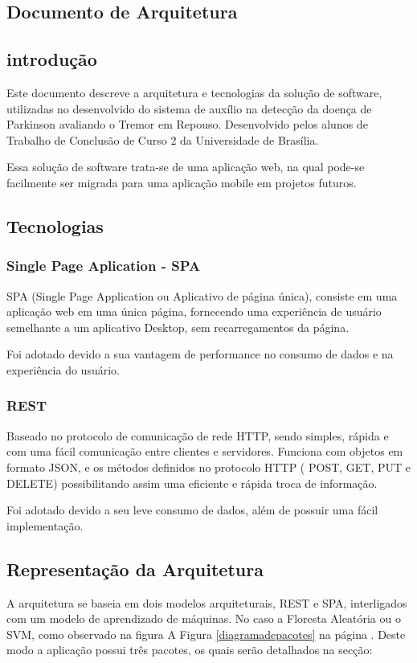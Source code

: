 \begin{anexosenv}

    \partanexos
    \chapter{Documento de Arquitetura}
    \label{adoarquitetura}
    \section{introdução}
    Este documento descreve a arquitetura e tecnologias da solução de software, utilizadas no desenvolvido do sistema de auxílio na detecção da doença de Parkinson avaliando o Tremor em Repouso. Desenvolvido pelos alunos de Trabalho de Conclusão de Curso 2 da Universidade de Brasília.

    Essa solução de software trata-se de uma aplicação web, na qual pode-se facilmente ser migrada para uma aplicação mobile em projetos futuros.

    \section{Tecnologias}
    \subsection{Single Page Aplication - SPA}
    SPA (Single Page Application ou Aplicativo de página única), consiste em uma aplicação web em uma única página, fornecendo uma experiência de usuário semelhante a um aplicativo Desktop, sem recarregamentos da página.

   Foi adotado devido a sua vantagem de performance no consumo de dados e na experiência do usuário.

    \subsection{REST}
    Baseado no protocolo de comunicação de rede HTTP, sendo simples, rápida e com uma fácil comunicação entre clientes e servidores. Funciona com objetos em formato JSON, e os métodos definidos no protocolo HTTP ( POST, GET, PUT e DELETE) possibilitando assim uma eficiente e rápida troca de informação.

   Foi adotado devido a seu leve consumo de dados, além de possuir uma fácil implementação.

    \section{Representação da Arquitetura}
    A arquitetura se baseia em dois modelos arquiteturais, REST e SPA, interligados com um modelo de aprendizado de máquinas. No caso a Floresta Aleatória ou o SVM, como observado na figura A Figura \ref{diagramadepacotes} na página \pageref{diagramadepacotes}. Deste modo a aplicação possui três pacotes, os quais serão detalhados na secção:


\end{anexosenv}
